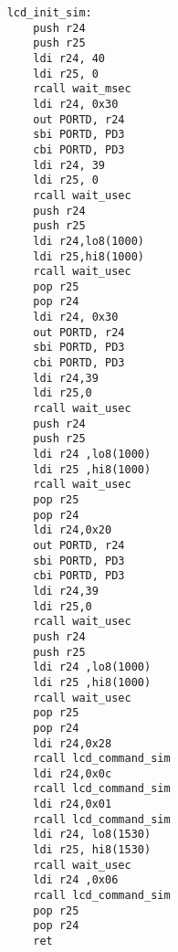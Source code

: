 \documentclass{article}
\begin{document}
\begin{verbatim}
	lcd_init_sim:
        push r24
        push r25
        ldi r24, 40
        ldi r25, 0
        rcall wait_msec
        ldi r24, 0x30
        out PORTD, r24
        sbi PORTD, PD3
        cbi PORTD, PD3
        ldi r24, 39
        ldi r25, 0
        rcall wait_usec
        push r24
        push r25
        ldi r24,lo8(1000)
        ldi r25,hi8(1000)
        rcall wait_usec
        pop r25
        pop r24
        ldi r24, 0x30
        out PORTD, r24
        sbi PORTD, PD3
        cbi PORTD, PD3
        ldi r24,39
        ldi r25,0
        rcall wait_usec 
        push r24
        push r25
        ldi r24 ,lo8(1000)
        ldi r25 ,hi8(1000)
        rcall wait_usec
        pop r25
        pop r24
        ldi r24,0x20
        out PORTD, r24
        sbi PORTD, PD3
        cbi PORTD, PD3
        ldi r24,39
        ldi r25,0
        rcall wait_usec
        push r24
        push r25
        ldi r24 ,lo8(1000)
        ldi r25 ,hi8(1000)
        rcall wait_usec
        pop r25
        pop r24
        ldi r24,0x28
        rcall lcd_command_sim
        ldi r24,0x0c
        rcall lcd_command_sim
        ldi r24,0x01
        rcall lcd_command_sim
        ldi r24, lo8(1530)
        ldi r25, hi8(1530)
        rcall wait_usec
        ldi r24 ,0x06
        rcall lcd_command_sim
        pop r25
        pop r24
        ret

\end{verbatim}
\end{document}
